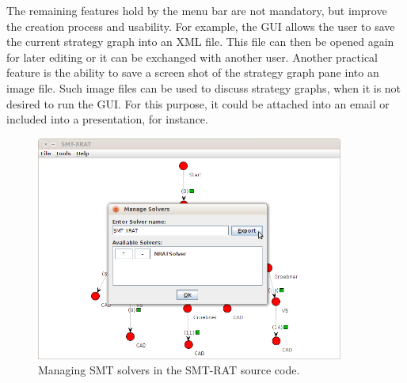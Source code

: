 The remaining features hold by the menu bar are not mandatory, but improve the creation process and usability. For example, the GUI allows the user to save the current strategy graph into an XML file. This file can then be opened again for later editing or it can be exchanged with another user. Another practical feature is the ability to save a screen shot of the strategy graph pane into an image file. Such image files can be used to discuss strategy graphs, when it is not desired to run the GUI. For this purpose, it could be attached into an email or included into a presentation, for instance.
\begin{figure}
  \begin{center}
    \includegraphics[width=0.9\textwidth]{graphics/smt-xrat_manage_solvers.png}
  \end{center}
  \caption{Managing SMT solvers in the SMT-RAT source code.}
  \label{fig:managing_smt_solvers}
\end{figure}


